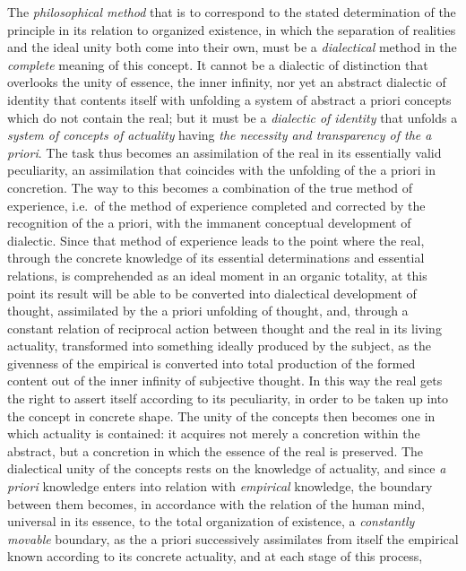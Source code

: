 The \emph{philosophical method} that is to correspond to the stated
determination of the principle in its relation to organized existence,
in which the separation of realities and the ideal unity both come into
their own, must be a \emph{dialectical} method in the \emph{complete}
meaning of this concept. It cannot be a dialectic of distinction that
overlooks the unity of essence, the inner infinity, nor yet
an abstract dialectic of identity that contents itself with unfolding a
system of abstract a priori concepts which do not contain the real; but
it must be a \emph{dialectic of identity} that unfolds a \emph{system of
concepts of actuality} having \emph{the necessity and transparency of
the a priori}. The task thus becomes an assimilation of the real in its
essentially valid peculiarity, an assimilation that coincides with the
unfolding of the a priori in concretion. The way to this becomes a
combination of the true method of experience, i.e.\ of the method of
experience completed and corrected by the recognition of the a priori,
with the immanent conceptual development of dialectic. Since that
method of experience leads to the point where the real, through the
concrete knowledge of its essential determinations and essential
relations, is comprehended as an ideal moment in an organic totality,
at this point its result will be able to be converted into dialectical
development of thought, assimilated by the a priori unfolding of
thought, and, through a constant relation of reciprocal action between
thought and the real in its living actuality, transformed into
something ideally produced by the subject, as the givenness of the
empirical is converted into total production of the formed content out
of the inner infinity of subjective thought. In this way the real gets
the right to assert itself according to its peculiarity, in order to be
taken up into the concept in concrete shape. The unity of the concepts
then becomes one in which actuality is contained: it acquires not
merely a concretion within the abstract, but a concretion in which the
essence of the real is preserved. The dialectical unity of the concepts
rests on the knowledge of actuality, and since \emph{a priori}
knowledge enters into relation with \emph{empirical} knowledge, the
boundary between them becomes, in accordance with the relation of the
human mind, universal in its essence, to the total organization of
existence, a \emph{constantly movable} boundary, as the a priori
successively assimilates from itself the empirical known according to
its concrete actuality, and at each stage of this process,
